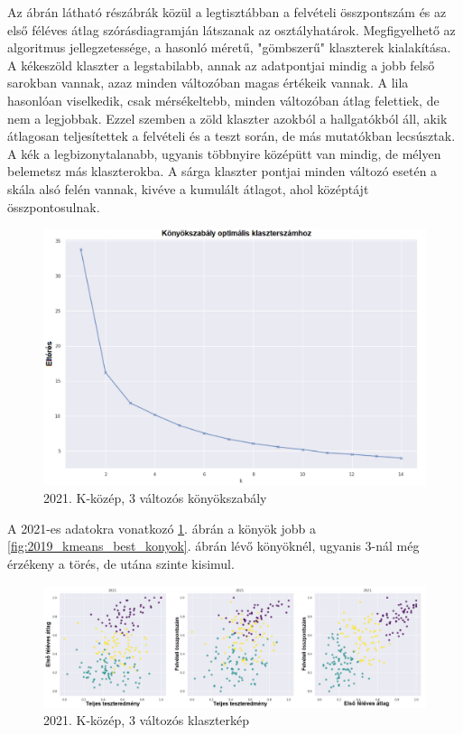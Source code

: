 \documentclass[12pt]{article}
\begin{document}
\noindent Az ábrán látható részábrák közül a legtisztábban a felvételi összpontszám és az első féléves átlag szórásdiagramján látszanak az osztályhatárok. Megfigyelhető az algoritmus jellegzetessége, a hasonló méretű, "gömbszerű" klaszterek kialakítása. A kékeszöld klaszter a legstabilabb, annak az adatpontjai mindig a jobb felső sarokban vannak, azaz minden változóban magas értékeik vannak. A lila hasonlóan viselkedik, csak mérsékeltebb, minden változóban átlag felettiek, de nem a legjobbak. Ezzel szemben a zöld klaszter azokból a hallgatókból áll, akik átlagosan teljesítettek a felvételi és a teszt során, de más mutatókban lecsúsztak. A kék a legbizonytalanabb, ugyanis többnyire középütt van mindig, de mélyen belemetsz más klaszterokba. A sárga klaszter pontjai minden változó esetén a skála alsó felén vannak, kivéve a kumulált átlagot, ahol középtájt összpontosulnak.

\begin{figure}[H]
\centering
\includegraphics[scale = 0.6]{kepek/2021_kmeans_konyok.png}
\caption{2021. K-közép, 3 változós könyökszabály}
\label{fig:2021_kmeans_konyok}
\end{figure}

A 2021-es adatokra vonatkozó \ref{fig:2021_kmeans_konyok}. ábrán a könyök jobb a \ref{fig:2019_kmeans_best_konyok}. ábrán lévő könyöknél, ugyanis 3-nál még érzékeny a törés, de utána szinte kisimul.

\begin{figure}[H]
\centering
\includegraphics[width = \textwidth]{kepek/2021klacter.png}
\caption{2021. K-közép, 3 változós klaszterkép}
\label{fig:2021klacter}
\end{figure}
\end{document}
